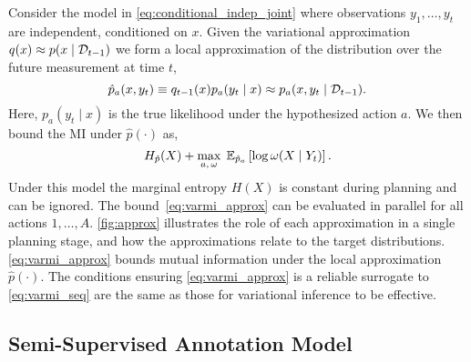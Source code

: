 Consider the model in \EQN\eqref{eq:conditional_indep_joint} where
observations $y_1,\ldots,y_t$ are independent, conditioned on $x$.
Given the variational approximation \mbox{$q(x) \approx p(x \mid
  \mathcal{D}_{t-1})$} we form a local approximation of the distribution
over the future measurement at time $t$,
\begin{equation}\label{eq:local_approx}
  \hat{p}_{a}(x,y_t) \equiv q_{t-1}(x) p_{a}(y_t \mid x) \approx p_a(x,y_t\mid \mathcal{D}_{t-1}).
\end{equation}
Here, $p_{a}(y_t \mid x)$ is the true likelihood under the
hypothesized action $a$.  We then bound the MI under
$\hat{p}(\cdot)$ as,
\begin{equation}\label{eq:varmi_approx}
  H_{\hat{p}}(X) + \max_{a, \,\omega}  \;\mathbb{E}_{\hat{p}_a}\left[ \log \omega(X \mid Y_{t})
  \right].
\end{equation}
Under this model the marginal entropy $H(X)$ is constant during
planning and can be ignored.  The bound~\eqref{eq:varmi_approx} can be
evaluated in parallel for all actions $1,\ldots,A$.
\FIG\ref{fig:approx} illustrates the role of each approximation in a
single planning stage, and how the approximations relate to the target
distributions.  \EQN\eqref{eq:varmi_approx} bounds mutual information
under the local approximation $\hat{p}(\cdot)$.  The conditions
ensuring \EQN\eqref{eq:varmi_approx} is a reliable surrogate to
\EQN\eqref{eq:varmi_seq} are the same as those for variational
inference to be effective.

\subsection{Semi-Supervised Annotation Model}\label{sec:annotation}

